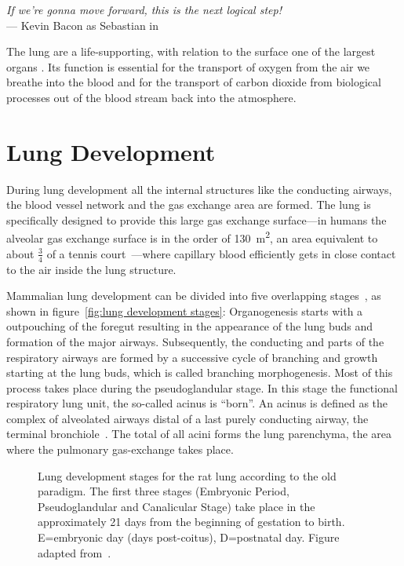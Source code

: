 \acresetall
{}\label{ch:lung}
\begin{flushright}{\slshape If we're gonna move forward, this is the next logical step!} \\ \medskip
	--- Kevin Bacon as Sebastian in \citep{HollowMan}
\end{flushright}
\vspace{52mm}

The lung are a life-supporting, with relation to the surface one of the largest organs . Its function is essential for the transport of oxygen from the air we breathe into the blood and for the transport of carbon dioxide from biological processes out of the blood stream back into the atmosphere.

\section{Lung Development}
During lung development all the internal structures like the conducting airways, the blood vessel network and the gas exchange area are formed. The lung is specifically designed to provide this large gas exchange surface---in humans the alveolar gas exchange surface is in the order of \SI{130}{\meter\squared}, an area equivalent to about $\frac{3}{4}$ of a tennis court~\cite{Weibel2009}---where capillary blood efficiently gets in close contact to the air inside the lung structure. 

Mammalian lung development can be divided into five overlapping stages~\cite{Schittny2004,Schittny2007a}, as shown in figure~\ref{fig:lung development stages}: Organogenesis starts with a outpouching of the foregut resulting in the appearance of the lung buds and formation of the major airways. Subsequently, the conducting and parts of the respiratory airways are formed by a successive cycle of branching and growth starting at the lung buds, which is called branching morphogenesis. Most of this process takes place during the pseudoglandular stage. In this stage the functional respiratory lung unit, the so-called acinus is ``born''. An acinus is defined as the complex of alveolated airways distal of a last purely conducting airway, the terminal bronchiole~\cite{Rodriguez1987}. The total of all acini forms the lung parenchyma, the area where the pulmonary gas-exchange takes place.

\begin{figure}[htb]
	\noindent\makebox[\textwidth]{%
		\centering%
		}%
	\caption[Lung development stages]{Lung development stages for the rat lung according to the old paradigm. The first three stages (Embryonic Period, Pseudoglandular and Canalicular Stage) take place in the approximately 21 days from the beginning of gestation to birth. E=embryonic day (days post-coitus), D=postnatal day. Figure adapted from~\cite{Schittny2007a}.}
	\label{fig:lung development stages old}
\end{figure}

